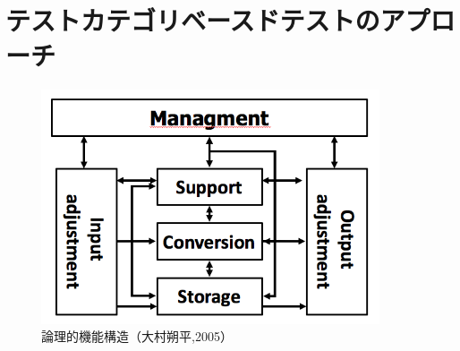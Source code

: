 \documentclass[a4paper,12pt]{jreport}
\begin{document}
\section{テストカテゴリベースドテストのアプローチ}

\begin{figure}[h]
  \begin{center}
  \includegraphics[width=10cm]{./image/D-3-Fig2.png}
  \caption{論理的機能構造（大村朔平,2005）}
  \label{fig:D-3-Fig2}
  \end{center}
   \end{figure}
\end{document}
